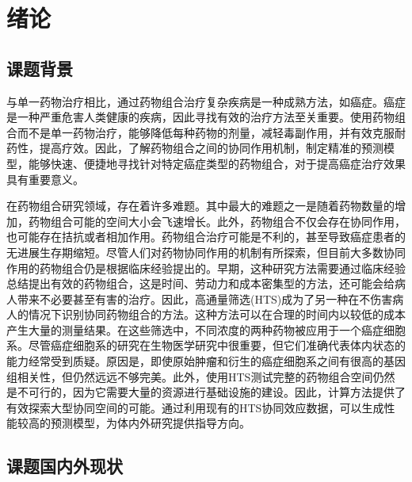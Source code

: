 \chapter{绪论}
\label{chap:intro}

\section{课题背景}

与单一药物治疗相比，通过药物组合治疗复杂疾病是一种成熟方法\supercite{1}，如癌症\supercite{2}。癌症是一种严重危害人类健康的疾病，因此寻找有效的治疗方法至关重要。使用药物组合而不是单一药物治疗，能够降低每种药物的剂量，减轻毒副作用\supercite{4}，并有效克服耐药性\supercite{5}，提高疗效。因此，了解药物组合之间的协同作用机制，制定精准的预测模型，能够快速、便捷地寻找针对特定癌症类型的药物组合，对于提高癌症治疗效果具有重要意义\supercite{3}。

在药物组合研究领域，存在着许多难题。其中最大的难题之一是随着药物数量的增加，药物组合可能的空间大小会飞速增长。此外，药物组合不仅会存在协同作用，也可能存在拮抗或者相加作用\supercite{6}\supercite{7}。药物组合治疗可能是不利的，甚至导致癌症患者的无进展生存期缩短\supercite{26}。尽管人们对药物协同作用的机制有所探索，但目前大多数协同作用的药物组合仍是根据临床经验提出的。早期，这种研究方法需要通过临床经验总结提出有效的药物组合，这是时间、劳动力和成本密集型的方法，还可能会给病人带来不必要甚至有害的治疗\supercite{8}。因此，高通量筛选(HTS)成为了另一种在不伤害病人的情况下识别协同药物组合的方法。这种方法可以在合理的时间内以较低的成本产生大量的测量结果\supercite{9}。在这些筛选中，不同浓度的两种药物被应用于一个癌症细胞系。尽管癌症细胞系的研究在生物医学研究中很重要，但它们准确代表体内状态的能力经常受到质疑。原因是，即使原始肿瘤和衍生的癌症细胞系之间有很高的基因组相关性，但仍然远远不够完美\supercite{27}。此外，使用HTS测试完整的药物组合空间仍然是不可行的，因为它需要大量的资源进行基础设施的建设\supercite{10}。因此，计算方法提供了有效探索大型协同空间的可能。通过利用现有的HTS协同效应数据，可以生成性能较高的预测模型，为体内外研究提供指导方向。

\section{课题国内外现状}

